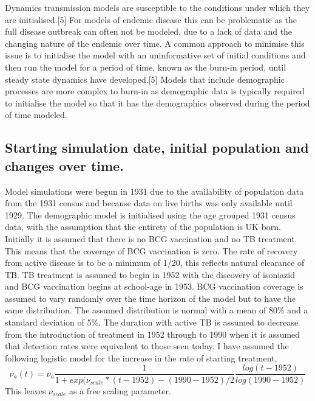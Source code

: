 \documentclass[11pt,twoside]{bristolthesis}
\begin{document}
  Dynamics transmission models are susceptible to the conditions under which they are initialised.{[}5{]} For models of endemic disease this can be problematic as the full disease outbreak can often not be modeled, due to a lack of data and the changing nature of the endemic over time. A common approach to minimise this issue is to initialise the model with an uninformative set of initial conditions and then run the model for a period of time, known as the burn-in period, until steady state dynamics have developed.{[}5{]} Models that include demographic processes are more complex to burn-in as demographic data is typically required to initialise the model so that it has the demographics observed during the period of time modeled.
  
  \hypertarget{starting-simulation-date-initial-population-and-changes-over-time.}{%
  \subsection{Starting simulation date, initial population and changes over time.}\label{starting-simulation-date-initial-population-and-changes-over-time.}}
  
  Model simulations were begun in 1931 due to the availability of population data from the 1931 census and because data on live births was only available until 1929. The demographic model is initialised using the age grouped 1931 census data, with the assumption that the entirety of the population is UK born. Initially it is assumed that there is no BCG vaccination and no TB treatment. This means that the coverage of BCG vaccination is zero. The rate of recovery from active disease is to be a minimum of 1/20, this reflects natural clearance of TB. TB treatment is assumed to begin in 1952 with the discovery of isoniazid and BCG vaccination begins at school-age in 1953. BCG vaccination coverage is assumed to vary randomly over the time horizon of the model but to have the same distribution. The assumed distribution is normal with a mean of 80\% and a standard deviation of 5\%. The duration with active TB is assumed to decrease from the introduction of treatment in 1952 through to 1990 when it is assumed that detection rates were equivalent to those seen today. I have assumed the following logistic model for the increase in the rate of starting treatment,
  \begin{equation}
  \nu_a(t) = \nu_a \frac{1}{1 + exp(\nu_{scale} * (t - 1952) - (1990 - 1952) / 2}
  \frac{log(t - 1952)}{log(1990 - 1952)}
    \label{eq:adjusted-treatment-starting}
  \end{equation}
  This leaves \(\nu_{scale}\) as a free scaling parameter.
  
\end{document}
